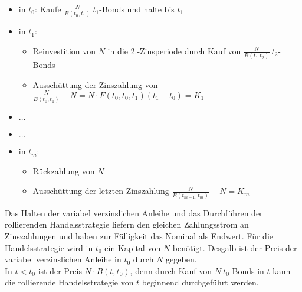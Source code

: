\begin{itemize}
	\item in $t_0$: Kaufe $\frac{N}{B(t_0,t_1)}~t_1$-Bonds und halte bis $t_1$
	\item in $t_1$: 
	\begin{itemize}
		\item Reinvestition von $N$ in die 2.-Zinsperiode durch Kauf von $\frac{N}{B(t_1.t_2)}~t_2$-Bonds
		\item Ausschüttung der Zinszahlung von $\frac{N}{B(t_0,t_1)}-N=N\cdot F(t_0,t_0,t_1)(t_1-t_0)=K_1$
	\end{itemize}
	\item $\dots$
	\item$\dots$
	\item in $t_m$:
	\begin{itemize}
		\item Rückzahlung von $N$
		\item Ausschüttung der letzten Zinszahlung $\frac{N}{B(t_{m-1},t_m)}-N=K_m$
	\end{itemize}
\end{itemize}
Das Halten der variabel verzinslichen Anleihe und das Durchführen der rollierenden Handelsstrategie liefern den gleichen Zahlungsstrom an Zinszahlungen und haben zur Fälligkeit das Nominal als Endwert. Für die Handelsstrategie wird in $t_0$ ein Kapital von $N$ benötigt. Desgalb ist der Preis der variabel verzinslichen Anleihe in $t_0$ durch $N$ gegeben. \\
In $t<t_0$ ist der Preis $N\cdot B(t,t_0)$, denn durch Kauf von $N~t_0$-Bonds in $t$ kann die rollierende Handelsstrategie von $t$ beginnend durchgeführt werden.

